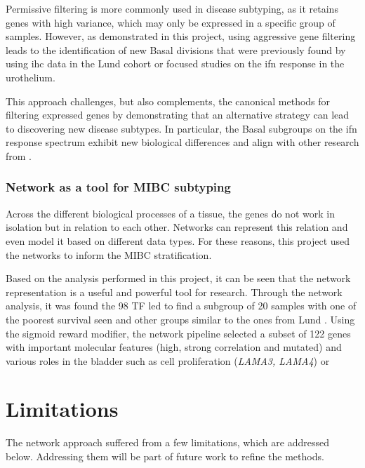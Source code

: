 Permissive filtering is more commonly used in disease subtyping, as it retains genes with high variance, which may only be expressed in a specific group of samples. However, as demonstrated in this project, using aggressive gene filtering leads to the identification of new Basal divisions that were previously found by using \acrshort{ihc} data in the Lund cohort \citep{Marzouka2018-ge} or focused studies on the \acrshort{ifn} response in the urothelium.

This approach challenges, but also complements, the canonical methods for filtering expressed genes by demonstrating that an alternative strategy can lead to discovering new disease subtypes. In particular, the Basal subgroups on the \acrshort{ifn} response spectrum exhibit new biological differences and align with other research from \citep{Marzouka2018-ge,Baker2022-bj}.


\subsubsection*{Network as a tool for MIBC subtyping}

Across the different biological processes of a tissue, the genes do not work in isolation but in relation to each other. Networks can represent this relation and even model it based on different data types. For these reasons, this project used the networks to inform the MIBC stratification. 

Based on the analysis performed in this project, it can be seen that the network representation is a useful and powerful tool for research. Through the network analysis, it was found the 98 TF led to find a subgroup of 20 samples with one of the poorest survival seen and other groups similar to the ones from Lund \citep{Marzouka2018-ge}. Using the sigmoid reward modifier, the network pipeline selected a subset of 122 genes with important molecular features (high, strong correlation and mutated) and various roles in the bladder such as cell proliferation (\textit{LAMA3, LAMA4}) or 

\section{Limitations} \label{s:limitations}

The network approach suffered from a few limitations, which are addressed below. Addressing them will be part of future work to refine the methods.

